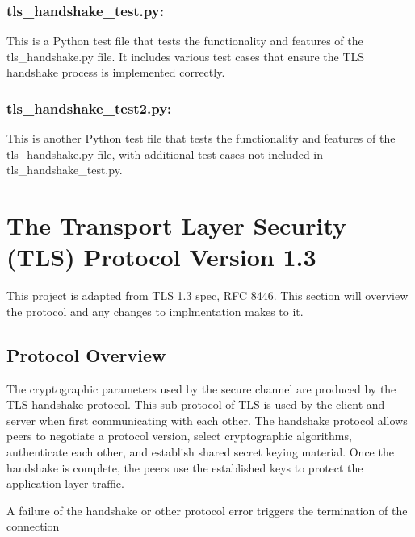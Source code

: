 \documentclass{article}
\begin{document}
\subsubsection{tls\_handshake\_test.py:}
This is a Python test file that tests the functionality and features of the tls\_handshake.py file.
It includes various test cases that ensure the TLS handshake process is implemented correctly.

\subsubsection{tls\_handshake\_test2.py:}
This is another Python test file that tests the functionality and features of the tls\_handshake.py file, with additional test cases not included in tls\_handshake\_test.py.

\newpage
\section{The Transport Layer Security (TLS) Protocol Version 1.3}
This project is adapted from TLS 1.3 spec, RFC 8446. This section will overview the protocol and any changes to implmentation makes to it.

\subsection{Protocol Overview}
The cryptographic parameters used by the secure channel are produced
   by the TLS handshake protocol.  This sub-protocol of TLS is used by
   the client and server when first communicating with each other.  The
   handshake protocol allows peers to negotiate a protocol version,
   select cryptographic algorithms, authenticate each other,
   and establish shared secret keying material.  Once the handshake is
   complete, the peers use the established keys to protect the
   application-layer traffic.

   A failure of the handshake or other protocol error triggers the
   termination of the connection
\end{document}
